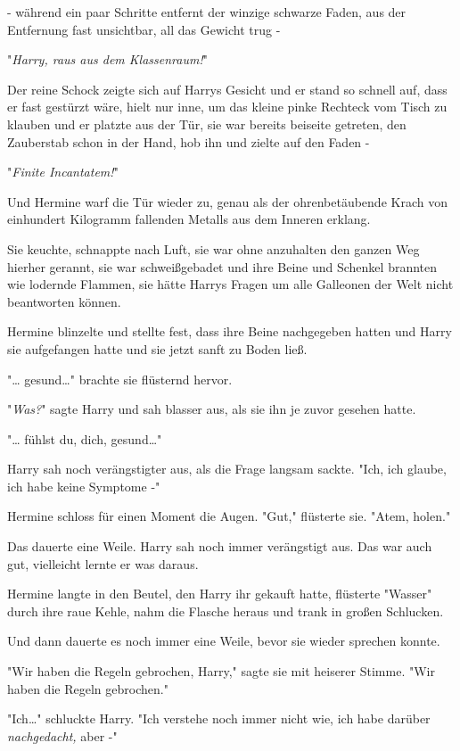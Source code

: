 {- während ein paar Schritte entfernt der winzige schwarze Faden, aus der Entfernung fast unsichtbar, all das Gewicht trug -

"\emph{Harry, raus aus dem Klassenraum!}"

Der reine Schock zeigte sich auf Harrys Gesicht und er stand so schnell auf, dass er fast gestürzt wäre, hielt nur inne, um das kleine pinke Rechteck vom Tisch zu klauben und er platzte aus der Tür, sie war bereits beiseite getreten, den Zauberstab schon in der Hand, hob ihn und zielte auf den Faden -

"\emph{Finite Incantatem!}"

Und Hermine warf die Tür wieder zu, genau als der ohrenbetäubende Krach von einhundert Kilogramm fallenden Metalls aus dem Inneren erklang.

Sie keuchte, schnappte nach Luft, sie war ohne anzuhalten den ganzen Weg hierher gerannt, sie war schweißgebadet und ihre Beine und Schenkel brannten wie lodernde Flammen, sie hätte Harrys Fragen um alle Galleonen der Welt nicht beantworten können.

Hermine blinzelte und stellte fest, dass ihre Beine nachgegeben hatten und Harry sie aufgefangen hatte und sie jetzt sanft zu Boden ließ.

"… gesund…" brachte sie flüsternd hervor.

"\emph{Was?}" sagte Harry und sah blasser aus, als sie ihn je zuvor gesehen hatte.

"… fühlst du, dich, gesund…"

Harry sah noch verängstigter aus, als die Frage langsam sackte. "Ich, ich glaube, ich habe keine Symptome -"

Hermine schloss für einen Moment die Augen. "Gut," flüsterte sie. "Atem, holen."

Das dauerte eine Weile. Harry sah noch immer verängstigt aus. Das war auch gut, vielleicht lernte er was daraus.

Hermine langte in den Beutel, den Harry ihr gekauft hatte, flüsterte "Wasser" durch ihre raue Kehle, nahm die Flasche heraus und trank in großen Schlucken.

Und dann dauerte es noch immer eine Weile, bevor sie wieder sprechen konnte.

"Wir haben die Regeln gebrochen, Harry," sagte sie mit heiserer Stimme. "Wir haben die Regeln gebrochen."

"Ich…" schluckte Harry. "Ich verstehe noch immer nicht wie, ich habe darüber \emph{nachgedacht,} aber -"

}
